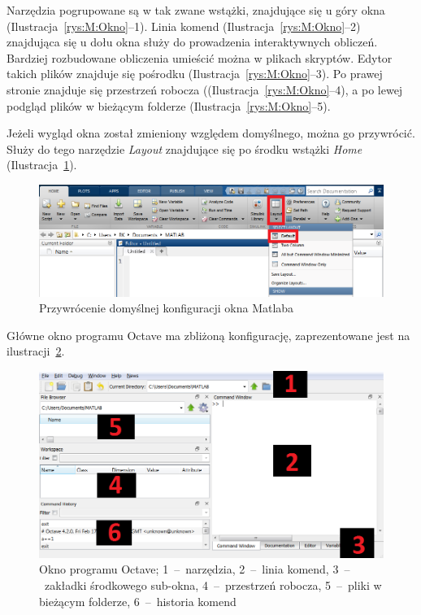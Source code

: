 \documentclass[10pt,a4paper]{article}
\begin{document}
	Narzędzia pogrupowane są w tak zwane wstążki, znajdujące się u góry okna (Ilustracja~\ref{rys:M:Okno}--1). Linia komend (Ilustracja~\ref{rys:M:Okno}--2) znajdująca się u dołu okna służy do prowadzenia interaktywnych obliczeń. Bardziej rozbudowane obliczenia umieścić można w plikach skryptów. Edytor takich plików znajduje się pośrodku (Ilustracja~\ref{rys:M:Okno}--3). Po prawej stronie znajduje się przestrzeń robocza ((Ilustracja~\ref{rys:M:Okno}--4), a po lewej podgląd plików w bieżącym folderze (Ilustracja~\ref{rys:M:Okno}--5).
	
	Jeżeli wygląd okna został zmieniony względem domyślnego, można go przywrócić. Służy do tego narzędzie \emph{Layout} znajdujące się po środku wstążki \emph{Home} (Ilustracja~\ref{rys:M:Okno2}).
	
	\begin{figure}[h!]
		\centering
		\includegraphics[width=1\textwidth]{Ilustracje/Matlab_Okno2.png}
		\caption{Przywrócenie domyślnej konfiguracji okna Matlaba}
		\label{rys:M:Okno2}
	\end{figure}

	Główne okno programu Octave ma zbliżoną konfigurację, zaprezentowane jest na ilustracji~\ref{rys:O:Okno}.
	
	\begin{figure}[h!]
		\centering
		\includegraphics[width=1\textwidth]{Ilustracje/Octave_Okno1.png}
		\caption[Okno programu Octave]{Okno programu Octave; 1~--~narzędzia, 2~--~linia komend, 3~--~zakładki środkowego sub-okna, 4~--~przestrzeń robocza, 5~--~pliki w bieżącym folderze, 6~--~historia komend}
		\label{rys:O:Okno}
	\end{figure}
\end{document}
